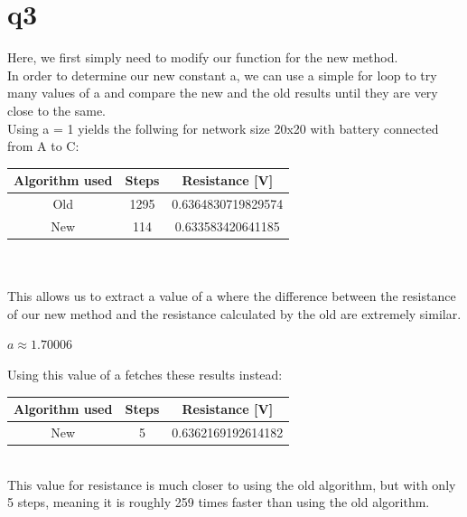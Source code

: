 \documentclass[a4paper,english]{article}
\begin{document}
    \section{q3}
    Here, we first simply need to modify our function for the new method. \\
    
    In order to determine our new constant a, we can use a simple for loop to try many
    values of a and compare the new and the old results until they are very close to the same.
    \\
    Using a = 1 yields the follwing for network size 20x20 with battery connected from A to C:
    \begin{center}
        \begin{tabular}{|c|c|c|}
            \hline
            Algorithm used & Steps & Resistance [V] \\
            \hline\hline
            Old & 1295 & 0.6364830719829574 \\
            New & 114 & 0.633583420641185 \\
            \hline
        \end{tabular}
    \end{center}
    \\
     \\
    This allows us to extract a value of a where the difference between the resistance of
    our new method and the resistance calculated by the old are extremely similar.
   \begin{center}
       $a \approx 1.70006$
   \end{center}
    Using this value of a fetches these results instead:
    \begin{center}
        \begin{tabular}{|c|c|c|}
            \hline
            Algorithm used & Steps & Resistance [V] \\
            \hline\hline
            New & 5 & 0.6362169192614182 \\
            \hline
        \end{tabular}
    \end{center}
    \\
    This value for resistance is much closer to using the old algorithm, but with only 5 steps,
    meaning it is roughly 259 times faster than using the old algorithm.
\end{document}

